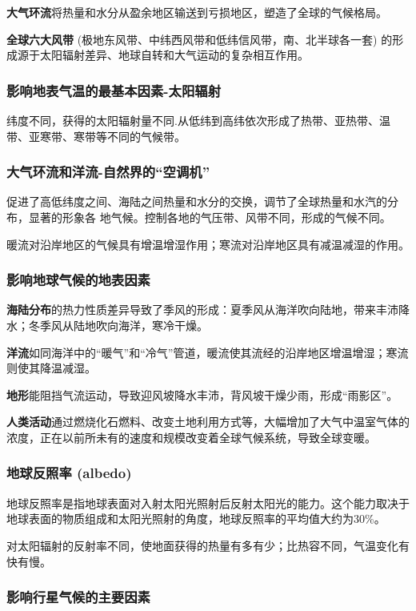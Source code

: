 \documentclass[12pt,a4paper]{article}
\begin{document}
	\textbf{大气环流}将热量和水分从盈余地区输送到亏损地区，塑造了全球的气候格局。
	
	\textbf{全球六大风带} (极地东风带、中纬西风带和低纬信风带，南、北半球各一套) 的形成源于太阳辐射差异、地球自转和大气运动的复杂相互作用。
	
	\subsubsection{影响地表气温的最基本因素-太阳辐射}
	
	纬度不同，获得的太阳辐射量不同.从低纬到高纬依次形成了热带、亚热带、温带、亚寒带、寒带等不同的气候带。
	\subsubsection{大气环流和洋流-自然界的“空调机”}
	促进了高低纬度之间、海陆之间热量和水分的交换，调节了全球热量和水汽的分布，显著的形象各 地气候。控制各地的气压带、风带不同，形成的气候不同。
	
	暖流对沿岸地区的气候具有增温增湿作用；寒流对沿岸地区具有减温减湿的作用。
	
	\subsubsection{影响地球气候的地表因素}
	\textbf{海陆分布}的热力性质差异导致了季风的形成：夏季风从海洋吹向陆地，带来丰沛降水；冬季风从陆地吹向海洋，寒冷干燥。
	
	\textbf{洋流}如同海洋中的“暖气”和“冷气”管道，暖流使其流经的沿岸地区增温增湿；寒流则使其降温减湿。
	
	\textbf{地形}能阻挡气流运动，导致迎风坡降水丰沛，背风坡干燥少雨，形成“雨影区”。
	
	\textbf{人类活动}通过燃烧化石燃料、改变土地利用方式等，大幅增加了大气中温室气体的浓度，正在以前所未有的速度和规模改变着全球气候系统，导致全球变暖。
	
	\subsubsection{地球反照率 (albedo)}
	
	地球反照率是指地球表面对入射太阳光照射后反射太阳光的能力。这个能力取决于地球表面的物质组成和太阳光照射的角度，地球反照率的平均值大约为30\%。
	
	对太阳辐射的反射率不同，使地面获得的热量有多有少；比热容不同，气温变化有快有慢。
	
	\subsubsection{影响行星气候的主要因素}
	
\end{document}
